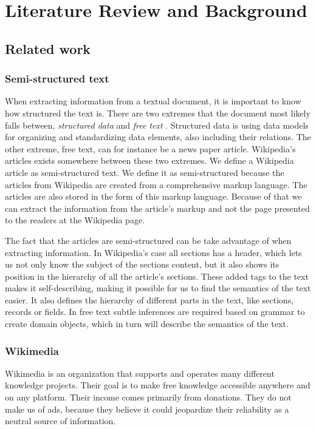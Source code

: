 
\chapter{Literature Review and Background}

\section{Related work}

\subsection{Semi-structured text}
When extracting information from a textual document, it is important to know how structured the text is. There are two extremes that the document most likely falls between, \textit{structured data} and \textit{free text}  \cite{semi-struc-text}. Structured data is using data models for organizing and standardizing data elements, also including their relations. The other extreme, free text, can for instance be a news paper article. Wikipedia's articles exists somewhere between these two extremes. We define a Wikipedia article as semi-structured text. We define it as semi-structured because the articles from Wikipedia are created from a comprehensive markup language. The articles are also stored in the form of this markup language. Because of that we can extract the information from the article's markup and not the page presented to the readers at the Wikipedia page. 

The fact that the articles are semi-structured can be take advantage of when extracting information. In Wikipedia's case all sections has a header, which lets us not only know the subject of the sections content, but it also shows its position in the hierarchy of all the article's sections. These added tags to the text makes it self-describing, making it possible for us to find the semantics of the text easier. It also defines the hierarchy of different parts in the text, like sections, records or fields. In free text subtle inferences are required based on grammar to create domain objects, which in turn will describe the semantics of the text. 

\subsection{Wikimedia} \label{wikimedia}
Wikimedia \cite{wikimedia} is an organization that supports and operates many different knowledge projects. Their goal is to make free knowledge accessible anywhere and on any platform. Their income comes primarily from donations. They do not make us of ads, because they believe it could jeopardize their reliability as a neutral source of information.

